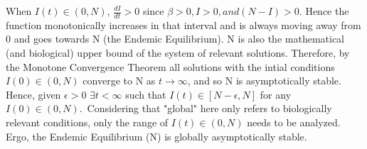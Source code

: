 When $I(t) \in (0,N)$,  $\frac{dI}{dt} >0$ since $\beta >0, I >0, and (N-I) >0$.
Hence the function monotonically increases in that interval and is always moving away from 0 and goes towards N (the Endemic Equilibrium).
N is also the mathematical (and biological) upper bound of the system of relevant solutions.
Therefore, by the Monotone Convergence Theorem all solutions with the intial conditions $I(0) \in (0,N)$ converge to N as $t\to\infty$, and so N is asymptotically stable.
Hence, given $\epsilon>0$ $\exists t<\infty$ such that $I(t) \in [N-\epsilon, N]$ for any $I(0) \in (0,N)$.\
Considering that "global" here only refers to biologically relevant conditions, only the range of $I(t) \in (0,N)$ needs to be analyzed.
Ergo, the Endemic Equilibrium (N) is globally asymptotically stable.
